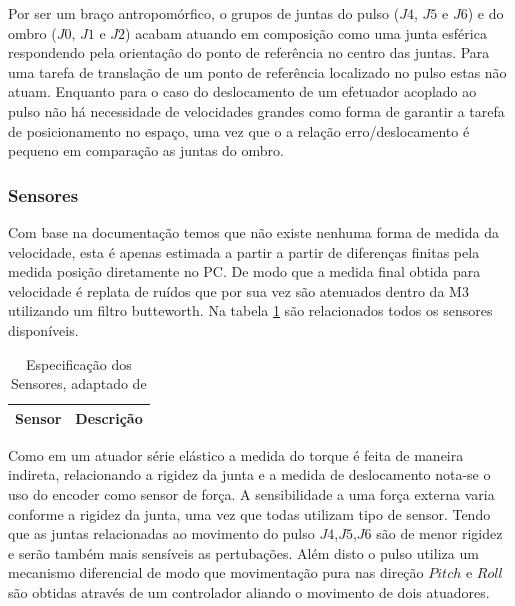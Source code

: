 Por ser um braço antropomórfico, o grupos de juntas do pulso ($J4$, $J5$ e $J6$) e do ombro ($J0$, $J1$ e $J2$) acabam atuando em composição como uma junta esférica respondendo pela orientação do ponto de referência no centro das juntas. Para uma tarefa de translação de um ponto de referência localizado no pulso estas não atuam. Enquanto para o caso do deslocamento de um efetuador acoplado ao pulso não há necessidade de velocidades grandes como forma de garantir a tarefa de posicionamento no espaço, uma vez que o a relação erro/deslocamento é pequeno em comparação as juntas do ombro.


\subsubsection{Sensores}


Com base na documentação temos que não existe nenhuma forma de medida da velocidade, esta é apenas estimada a partir a partir de diferenças finitas pela medida posição diretamente no PC. De modo que a medida final obtida para velocidade é replata de ruídos que por sua vez são atenuados dentro da M3 utilizando um filtro butteworth. Na tabela \ref{tab:a2armSensorDoc} são relacionados todos os sensores disponíveis.


\begin{table}[H]
    \centering
    \caption{Especificação dos Sensores, adaptado de \cite{mekaguide}}
    \begin{tabular}{ll}
         \hline
         Sensor & Descrição\\
         \hline
         
         \hline
    \end{tabular}
    \label{tab:a2armSensorDoc}
\end{table}

Como em um atuador série elástico a medida do torque é feita de maneira indireta, relacionando a rigidez da junta e a medida de deslocamento nota-se o uso do encoder como sensor de força. A sensibilidade a uma força externa varia conforme a rigidez da junta, uma vez que todas utilizam tipo de sensor. Tendo que as juntas relacionadas ao movimento do pulso $J4$,$J5$,$J6$ são de menor rigidez e serão também mais sensíveis as pertubações. Além disto o pulso utiliza um mecanismo diferencial de modo que movimentação pura nas direção $Pitch$ e $Roll$ são obtidas através de um controlador aliando o movimento de dois atuadores.

